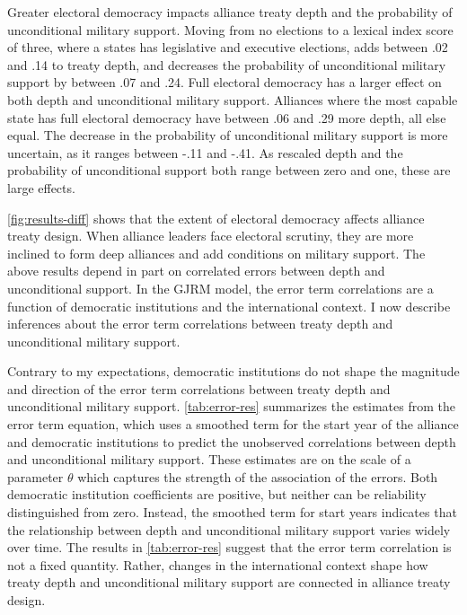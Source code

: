 \documentclass[12pt]{article}
\begin{document}
Greater electoral democracy impacts alliance treaty depth and the probability of unconditional military support. 
Moving from no elections to a lexical index score of three, where a states has legislative and executive elections, adds between .02 and .14 to treaty depth, and decreases the probability of unconditional military support by between .07 and .24.
Full electoral democracy has a larger effect on both depth and unconditional military support. 
Alliances where the most capable state has full electoral democracy have between .06 and .29 more depth, all else equal. 
The decrease in the probability of unconditional military support is more uncertain, as it ranges between -.11 and -.41. 
As rescaled depth and the probability of unconditional support both range between zero and one, these are large effects.


\autoref{fig:results-diff} shows that the extent of electoral democracy affects alliance treaty design.
When alliance leaders face electoral scrutiny, they are more inclined to form deep alliances and add conditions on military support. 
The above results depend in part on correlated errors between depth and unconditional support. 
In the GJRM model, the error term correlations are a function of democratic institutions and the international context. 
I now describe inferences about the error term correlations between treaty depth and unconditional military support. 


Contrary to my expectations, democratic institutions do not shape the magnitude and direction of the error term correlations between treaty depth and unconditional military support.
\autoref{tab:error-res} summarizes the estimates from the error term equation, which uses a smoothed term for the start year of the alliance and democratic institutions to predict the unobserved correlations between depth and unconditional military support. 
These estimates are on the scale of a parameter $\theta$ which captures the strength of the association of the errors. 
Both democratic institution coefficients are positive, but neither can be reliability distinguished from zero. 
Instead, the smoothed term for start years indicates that the relationship between depth and unconditional military support varies widely over time. 
The results in \autoref{tab:error-res} suggest that the error term correlation is not a fixed quantity. 
Rather, changes in the international context shape how treaty depth and unconditional military support are connected in alliance treaty design.
\end{document}
